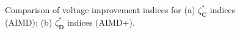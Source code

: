 \begin{figure}\centering
	\caption{Comparison of voltage improvement indices for (a) $\zeta_\textbf{C}^{*}$ indices (AIMD); (b) $\zeta_\textbf{D}^{*}$ indices (AIMD+).}
	\label{ch4:fig:voltage-aimd}
\end{figure}
